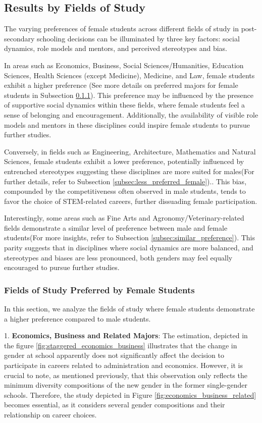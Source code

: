 
\subsection{Results by Fields of Study}
The varying preferences of female students across different fields of study  in post-secondary schooling decisions can be illuminated by three key factors: social dynamics, role models and mentors, and perceived stereotypes and bias.

In areas such as Economics, Business, Social Sciences/Humanities, Education Sciences, Health Sciences (except Medicine), Medicine, and Law, female students exhibit a higher preference  (See more details on preferred majors for female students in Subsection \ref{subsec:prefered_female}). This preference may be influenced by the presence of supportive social dynamics within these fields, where female students feel a sense of belonging and encouragement. Additionally, the availability of visible role models and mentors in these disciplines could inspire female students to pursue further studies.

Conversely, in fields such as Engineering, Architecture, Mathematics and Natural Sciences, female students exhibit a lower preference, potentially influenced by entrenched stereotypes suggesting these disciplines are more suited for males(For further details, refer to Subsection \ref{subsec:less_preferred_female}).. This bias, compounded by the competitiveness often observed in male students, tends to favor the choice of STEM-related careers, further dissuading female participation.



Interestingly, some areas such as Fine Arts and Agronomy/Veterinary-related fields demonstrate a similar level of preference between male and female students(For more insights, refer to Subsection \ref{subsec:similar_preference}). This parity suggests that in disciplines where social dynamics are more balanced, and stereotypes and biases are less pronounced, both genders may feel equally encouraged to pursue further studies.


\subsubsection{Fields of Study  Preferred by Female Students} \label{subsec:prefered_female}
In this section, we analyze the fields of study  where female students demonstrate a higher preference compared to male students.

1. \textbf{Economics, Business and  Related Majors}: The \citet{SUN2021175} estimation, depicted in the figure \ref{fig:staggered_economics_business} illustrates that the change in gender at school apparently does not significantly affect the decision to participate in careers related to administration and economics. However, it is crucial to note, as mentioned previously, that this observation only reflects the minimum diversity compositions of the new gender in the former single-gender schools. Therefore, the study depicted in Figure  \ref{fig:economics_business_related} becomes essential, as it considers several gender compositions and their relationship on career choices.
 



